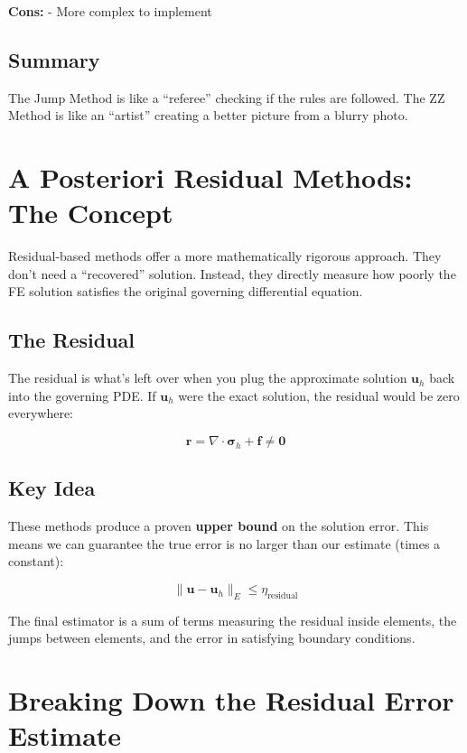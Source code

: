 \documentclass[
  11pt,
  a4paper,
]{scrbook}
\begin{document}
\textbf{Cons:} - More complex to implement

\subsection{Summary}\label{summary-1}

The Jump Method is like a ``referee'' checking if the rules are
followed. The ZZ Method is like an ``artist'' creating a better picture
from a blurry photo.

\section{A Posteriori Residual Methods: The
Concept}\label{a-posteriori-residual-methods-the-concept}

Residual-based methods offer a more mathematically rigorous approach.
They don't need a ``recovered'' solution. Instead, they directly measure
how poorly the FE solution satisfies the original governing differential
equation.

\subsection{The Residual}\label{the-residual}

The residual is what's left over when you plug the approximate solution
\(\mathbf{u}_h\) back into the governing PDE. If \(\mathbf{u}_h\) were
the exact solution, the residual would be zero everywhere:

\[\mathbf{r} = \nabla \cdot \boldsymbol{\sigma}_h + \mathbf{f} \neq \mathbf{0}\]

\subsection{Key Idea}\label{key-idea}

These methods produce a proven \textbf{upper bound} on the solution
error. This means we can guarantee the true error is no larger than our
estimate (times a constant):

\[\| \mathbf{u} - \mathbf{u}_h \|_E \le \eta_{\text{residual}}\]

The final estimator is a sum of terms measuring the residual inside
elements, the jumps between elements, and the error in satisfying
boundary conditions.

\section{Breaking Down the Residual Error
Estimate}\label{breaking-down-the-residual-error-estimate}
\end{document}
